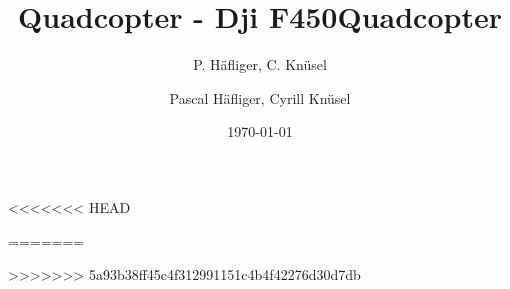 <<<<<<< HEAD
\title{Quadcopter - Dji F450}  
\author{P. Häfliger, C. Knüsel}
=======
\title{Quadcopter}  
\author{Pascal Häfliger, Cyrill Knüsel}
>>>>>>> 5a93b38ff45c4f312991151c4b4f42276d30d7db
\date{\today} 

\begin{frame}[plain]
\titlepage
\end{frame} 